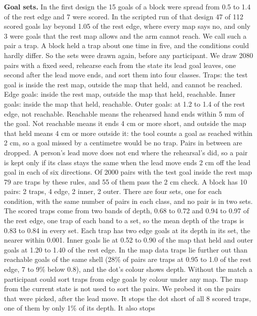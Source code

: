 \documentclass[pdflatex,sn-mathphys-num]{sn-jnl}
\begin{document}
\textbf{Goal sets.} In the first design the 15 goals of a block were spread from 0.5 to 1.4 of the rest edge and
7 were scored. In the scripted run of that design 47 of 112 scored goals lay beyond 1.05 of the rest edge, where
every map says no, and only 3 were goals that the rest map allows and the arm cannot reach. We call such a pair a
trap. A block held a trap about one time in five, and the conditions could hardly differ. %
So the sets were drawn again, before any participant. We draw 2080 pairs with a fixed seed, rehearse each from
the state its lead goal leaves, one second after the lead move ends, and sort them into four classes. Traps: the
test goal is inside the rest map, outside the map that held, and cannot be reached. Edge goals: inside the rest
map, outside the map that held, reachable. Inner goals: inside the map that held, reachable. Outer goals: at 1.2
to 1.4 of the rest edge, not reachable. Reachable means the rehearsed hand ends within 5 mm of the goal. Not
reachable means it ends 4 cm or more short, and outside the map that held means 4 cm or more outside it: the tool
counts a goal as reached within 2 cm, so a goal missed by a centimetre would be no trap. Pairs in between are
dropped. A person's lead move does not end where the rehearsal's did, so a pair is kept only if its class stays
the same when the lead move ends 2 cm off the lead goal in each of six directions. Of 2000 pairs with the test
goal inside the rest map 79 are traps by these rules, and 55 of them pass the 2 cm check. %
A block has 10 pairs: 2 traps, 4 edge, 2 inner, 2 outer. There are four sets, one for each condition, with the
same number of pairs in each class, and no pair is in two sets. The scored traps come from two bands of depth,
0.68 to 0.72 and 0.94 to 0.97 of the rest edge, one trap of each band to a set, so the mean depth of the traps
is 0.83 to 0.84 in every set. Each trap has two edge goals at its depth in its set, the nearer within 0.001.
Inner goals lie at 0.52 to 0.90 of the map that held and outer goals at 1.20 to 1.40 of the rest edge.
In the map data traps lie further out than
reachable goals of the same shell (28\% of pairs are traps at 0.95 to 1.0 of the rest edge, 7 to 9\% below 0.8),
and the dot's colour shows depth. Without the match a participant could sort traps from edge goals by colour
under any map. %
The map from the current state is not used to sort the pairs. We probed it on the pairs that were picked, after
the lead move. It stops the dot short of all 8 scored traps, one of them by only 1\% of its depth. It also stops
\end{document}

